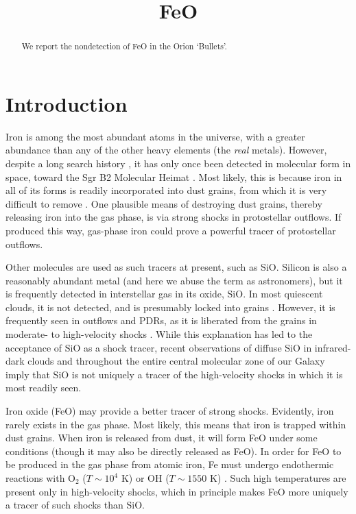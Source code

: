 \documentclass[twocolumn]{aastex61}
\begin{document}
\title{FeO}
\begin{abstract}
We report the nondetection of FeO in the Orion `Bullets'.
\end{abstract}

\section{Introduction}

Iron is among the most abundant atoms in the universe, with a greater abundance
than any of the other heavy elements (the \emph{real} metals).  However,
despite a long search history \citep{Merer1982a}, it has only once been
detected in molecular form in space, toward the Sgr B2 Molecular Heimat
\citep{Walmsley2002a,Furuya2003a}.  Most likely, this is because iron in all of
its forms is readily incorporated into dust grains, from which it is very
difficult to remove \citep{Silvia2012a,Nozawa2003a}.  One plausible means
of destroying dust grains, thereby releasing iron into the gas phase, is
via strong shocks in protostellar outflows.  If produced this way, gas-phase
iron could prove a powerful tracer of protostellar outflows.

Other molecules are used as such tracers at present, such as SiO.  Silicon is
also a reasonably abundant metal (and here we abuse the term as astronomers),
but it is frequently detected in interstellar gas in its oxide, SiO.  In most
quiescent clouds, it is not detected, and is presumably locked into grains
\citep{Ziurys1989a}.  However, it is frequently seen in outflows and PDRs, as
it is liberated from the grains in moderate- to high-velocity shocks
\citep[$v_s>10$
\kms;][]{Schilke1997a,Schilke2001a,Jimenez-Serra2008a,Anderl2013a,Gusdorf2008a,Gusdorf2008b}.
While this explanation has led to the acceptance of SiO as a shock tracer,
recent observations of diffuse SiO in infrared-dark clouds
\citep{Jimenez-Serra2010a} and throughout the entire central molecular zone of
our Galaxy \citep{Jones2012a} imply that SiO is not uniquely a tracer of the
high-velocity shocks in which it is most readily seen.

Iron oxide (FeO) may provide a better tracer of strong shocks.  Evidently, iron
rarely exists in the gas phase.  Most likely, this means that iron is trapped
within dust grains.  When iron is released from dust, it will form FeO under
some conditions (though it may also be directly released as FeO).  In order for
FeO to be produced in the gas phase from atomic iron, Fe must undergo
endothermic reactions with O$_2$ ($T\sim10^4$ K) or OH ($T\sim1550$ K)
\citep{Walmsley2002a}. Such high temperatures are present only in high-velocity
shocks, which in principle makes FeO more uniquely a tracer of such shocks
than SiO.
\end{document}
